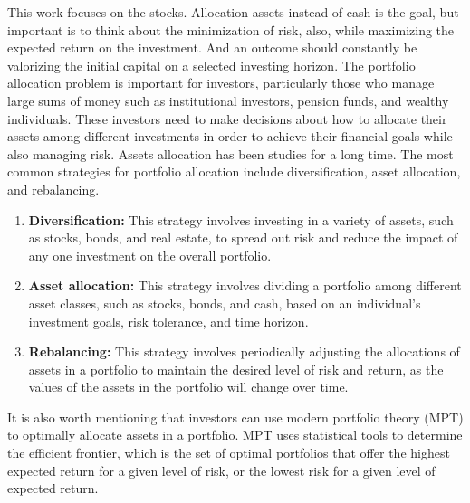 This work focuses on the stocks.
Allocation assets instead of cash is the goal, but important is to think about the minimization of risk, also, while maximizing the expected return on the investment.
And an outcome should constantly be valorizing the initial capital on a selected investing horizon.
The portfolio allocation problem is important for investors, particularly those who manage large sums of money such as institutional investors, pension funds, and wealthy individuals. These investors need to make decisions about how to allocate their assets among different investments in order to achieve their financial goals while also managing risk.
Assets allocation has been studies for a long time.
The most common strategies for portfolio allocation include diversification, asset allocation, and rebalancing.
\begin{enumerate}[label=\textbf{\arabic*}., ref=\arabic*]
    \item \textbf{Diversification:} This strategy involves investing in a variety of assets, such as stocks, bonds, and real estate, to spread out risk and reduce the impact of any one investment on the overall portfolio.
    \item \textbf{Asset allocation:}  This strategy involves dividing a portfolio among different asset classes, such as stocks, bonds, and cash, based on an individual's investment goals, risk tolerance, and time horizon.
    \item \textbf{Rebalancing:} This strategy involves periodically adjusting the allocations of assets in a portfolio to maintain the desired level of risk and return, as the values of the assets in the portfolio will change over time.
\end{enumerate}
It is also worth mentioning that investors can use modern portfolio theory (MPT) to optimally allocate assets in a portfolio.
MPT uses statistical tools to determine the efficient frontier, which is the set of optimal portfolios that offer the highest expected return for a given level of risk, or the lowest risk for a given level of expected return.~\cite{sirucek-2015}


